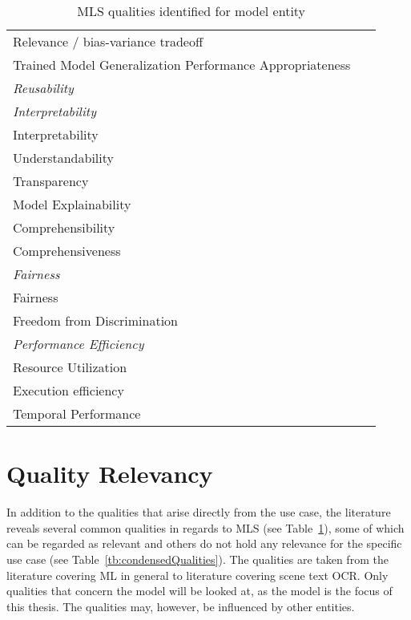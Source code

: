 \begin{table}[h]
\begin{tabular}{p{} p{}}
        Relevance / bias-variance tradeoff &~\cite{siebert_construction_2021, zhang_machine_2020} \\
        Trained Model Generalization Performance Appropriateness
                                                    &~\cite{nakamichi_requirements-driven_2020} \\
        \midrule
        \textit{Reusability} &~\cite{ashmore_assuring_2021} \\
        \midrule
        \textit{Interpretability} \\
        Interpretability &~\cite{ashmore_assuring_2021, siebert_construction_2021, zhang_machine_2020}\\
        Understandability &~\cite{nakamichi_requirements-driven_2020} \\
        Transparency &~\cite{arpteg_software_2018} \\
        Model Explainability &~\cite{vogelsang_requirements_2019} \\
        Comprehensibility &~\cite{ashmore_assuring_2021} \\
        Comprehensiveness &~\cite{ashmore_assuring_2021} \\
        \midrule
        \textit{Fairness}\\
        Fairness &~\cite{siebert_construction_2021, zhang_machine_2020} \\
        Freedom from Discrimination &~\cite{vogelsang_requirements_2019} \\
        \midrule
        \textit{Performance Efficiency} \\
        Resource Utilization &~\cite{siebert_construction_2021,
                                nakamichi_requirements-driven_2020} \\
        Execution efficiency &~\cite{siebert_construction_2021} \\
        Temporal Performance &~\cite{nakamichi_requirements-driven_2020} \\
        \bottomrule
    \end{tabular}
    \caption{MLS qualities identified for model entity\label{tb:LiteratureQualitiesModel}}
\end{table}
\FloatBarrier%

\section{Quality Relevancy}\label{se:relevant-qualities}
In addition to the qualities that arise directly from the use case, the literature reveals several
common qualities in regards to \ac{MLS} (see Table~\ref{tb:LiteratureQualitiesModel}), some of which
can be regarded as relevant and others do not hold any relevance for the specific use case (see
Table~\ref{tb:condensedQualities}).
The qualities are taken from the literature covering \ac{ML} in general to literature
covering scene text \ac{OCR}.
Only qualities that concern the model will be looked at, as the model is the focus of this thesis.
The qualities may, however, be influenced by other entities.

